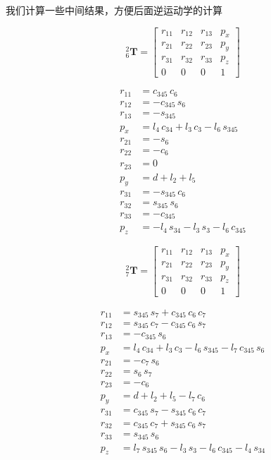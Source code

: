 \documentclass{homework}
\begin{document}
\begin{sol}
我们计算一些中间结果，方便后面逆运动学的计算

\[
  _6^2\mathbf{T} =
\begin{bmatrix} 
r_{11} & r_{12} & r_{13} & p_x \\ 
r_{21} & r_{22} & r_{23} & p_y \\ 
r_{31} & r_{32} & r_{33} & p_z \\ 
0 & 0 & 0 & 1
\end{bmatrix}
\] 

\begin{align*} 
r_{11} &= c_{345}\,c_{6} \\ 
r_{12} &= -c_{345}\,s_{6} \\ 
r_{13} &= -s_{345} \\ 
p_x &= l_{4}\,c_{34}+l_{3}\,c_{3}-l_{6}\,s_{345} \\ 
r_{21} &= -s_{6} \\ 
r_{22} &= -c_{6} \\ 
r_{23} &= 0 \\ 
p_y &= d+l_{2}+l_{5} \\ 
r_{31} &= -s_{345}\,c_{6} \\ 
r_{32} &= s_{345}\,s_{6} \\ 
r_{33} &= -c_{345} \\ 
p_z &= -l_{4}\,s_{34}-l_{3}\,s_{3}-l_{6}\,c_{345}
\end{align*}

\[
  _7^2\mathbf{T} =
\begin{bmatrix} 
r_{11} & r_{12} & r_{13} & p_x \\ 
r_{21} & r_{22} & r_{23} & p_y \\ 
r_{31} & r_{32} & r_{33} & p_z \\ 
0 & 0 & 0 & 1
\end{bmatrix}
\] 

\begin{align*} 
r_{11} &= s_{345}\,s_{7}+c_{345}\,c_{6}\,c_{7} \\ 
r_{12} &= s_{345}\,c_{7}-c_{345}\,c_{6}\,s_{7} \\ 
r_{13} &= -c_{345}\,s_{6} \\ 
p_x &= l_{4}\,c_{34}+l_{3}\,c_{3}-l_{6}\,s_{345}-l_{7}\,c_{345}\,s_{6} \\ 
r_{21} &= -c_{7}\,s_{6} \\ 
r_{22} &= s_{6}\,s_{7} \\ 
r_{23} &= -c_{6} \\ 
p_y &= d+l_{2}+l_{5}-l_{7}\,c_{6} \\ 
r_{31} &= c_{345}\,s_{7}-s_{345}\,c_{6}\,c_{7} \\ 
r_{32} &= c_{345}\,c_{7}+s_{345}\,c_{6}\,s_{7} \\ 
r_{33} &= s_{345}\,s_{6} \\ 
p_z &= l_{7}\,s_{345}\,s_{6}-l_{3}\,s_{3}-l_{6}\,c_{345}-l_{4}\,s_{34}
\end{align*}


\end{sol}
\end{document}

